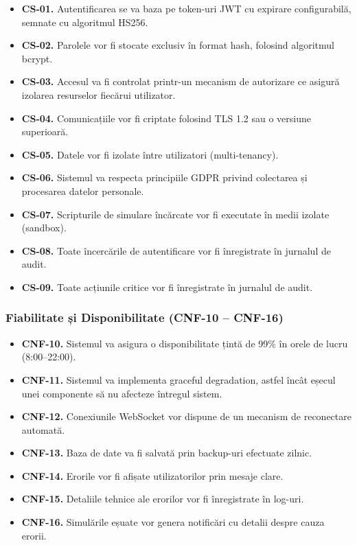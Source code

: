 \documentclass[../../main.tex]{subfiles}
\begin{document}
        \begin{itemize}
            \item \textbf{CS-01.} Autentificarea se va baza pe token-uri JWT cu expirare configurabilă, semnate cu algoritmul HS256.
            \item \textbf{CS-02.} Parolele vor fi stocate exclusiv în format hash, folosind algoritmul bcrypt.
            \item \textbf{CS-03.} Accesul va fi controlat printr-un mecanism de autorizare ce asigură izolarea resurselor fiecărui utilizator.
            \item \textbf{CS-04.} Comunicațiile vor fi criptate folosind TLS 1.2 sau o versiune superioară.
            \item \textbf{CS-05.} Datele vor fi izolate între utilizatori (multi-tenancy).
            \item \textbf{CS-06.} Sistemul va respecta principiile GDPR privind colectarea și procesarea datelor personale.
            \item \textbf{CS-07.} Scripturile de simulare încărcate vor fi executate în medii izolate (sandbox).
            \item \textbf{CS-08.} Toate încercările de autentificare vor fi înregistrate în jurnalul de audit.
            \item \textbf{CS-09.} Toate acțiunile critice vor fi înregistrate în jurnalul de audit.
        \end{itemize}

        \subsubsection{Fiabilitate și Disponibilitate (CNF-10 -- CNF-16)}

        \begin{itemize}
            \item \textbf{CNF-10.} Sistemul va asigura o disponibilitate țintă de 99\% în orele de lucru (8:00--22:00).
            \item \textbf{CNF-11.} Sistemul va implementa graceful degradation, astfel încât eșecul unei componente să nu afecteze întregul sistem.
            \item \textbf{CNF-12.} Conexiunile WebSocket vor dispune de un mecanism de reconectare automată.
            \item \textbf{CNF-13.} Baza de date va fi salvată prin backup-uri efectuate zilnic.
            \item \textbf{CNF-14.} Erorile vor fi afișate utilizatorilor prin mesaje clare.
            \item \textbf{CNF-15.} Detaliile tehnice ale erorilor vor fi înregistrate în log-uri.
            \item \textbf{CNF-16.} Simulările eșuate vor genera notificări cu detalii despre cauza erorii.
        \end{itemize}
\end{document}
